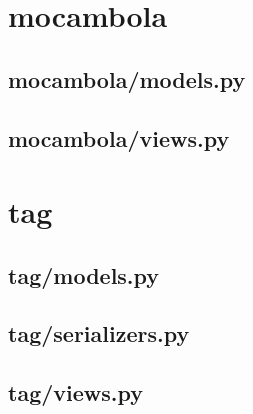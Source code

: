 \section{mocambola}

\subsection{mocambola/models.py}


%

\subsection{mocambola/views.py}




\section{tag}

\subsection{tag/models.py}


\subsection{tag/serializers.py}


\subsection{tag/views.py}


%

%


